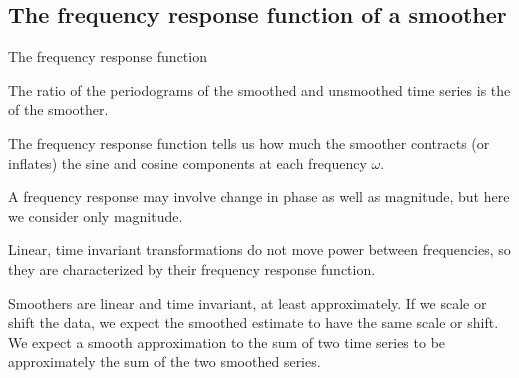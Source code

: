 \subsection{The frequency response function of a smoother}

\begin{frame}{The frequency response function}

\vspace{-2mm}

\bi
\item The ratio of the periodograms of the smoothed and unsmoothed time series is the  of the smoother.

\item The frequency response function tells us how much the smoother contracts (or inflates) the sine and cosine components at each frequency $\omega$.

\item A frequency response may involve change in phase as well as magnitude, but here we consider only magnitude.

\item Linear, time invariant transformations do not move power between frequencies, so they are characterized by their frequency response function.

\item Smoothers are linear and time invariant, at least approximately. If we scale or shift the data, we expect the smoothed estimate to have the same scale or shift. We expect a smooth approximation to the sum of two time series to be approximately the sum of the two smoothed series.

\ei

\end{frame}

